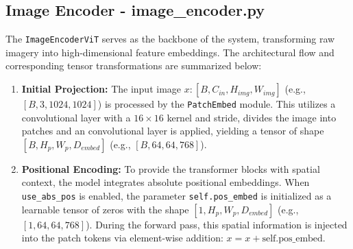\subsection{Image Encoder - image\_encoder.py}
The \texttt{ImageEncoderViT} serves as the backbone of the system, transforming raw imagery into high-dimensional feature embeddings. The architectural flow and corresponding tensor transformations are summarized below:

\begin{enumerate}
	\item \textbf{Initial Projection:} The input image $x: [B, C_{in}, H_{img}, W_{img}] $ (e.g., $[B, 3, 1024,1024]$) is processed by the \texttt{PatchEmbed} module. This utilizes a convolutional layer with a $16 \times 16$ kernel and stride, divides the image into patches and an convolutional layer is applied, yielding a tensor of shape $[B, H_{p}, W_{p}, D_{embed}]$ (e.g., $[B, 64, 64, 768]$).
	\item \textbf{Positional Encoding:} To provide the transformer blocks with spatial context, the model integrates absolute positional embeddings. When \texttt{use\_abs\_pos} is enabled, the parameter \texttt{self.pos\_embed} is initialized as a learnable tensor of zeros with the shape $[1, H_{p}, W_{p}, D_{embed}]$ (e.g., $[1, 64, 64, 768]$). During the forward pass, this spatial information is injected into the patch tokens via element-wise addition: $x = x + \text{self.pos\_embed}$. 
	

\end{enumerate}
